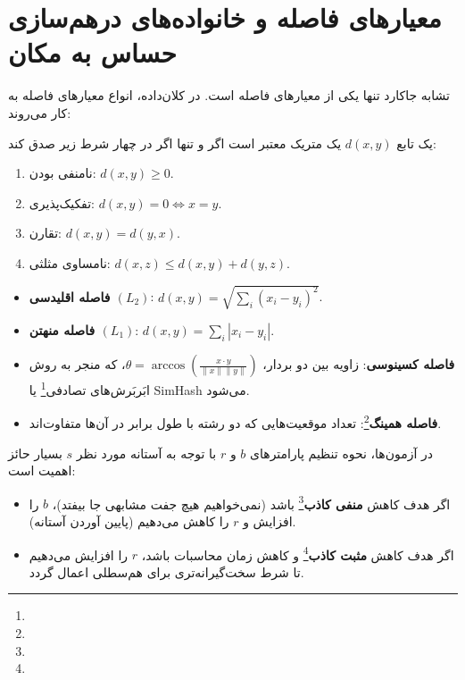 \section{معیارهای فاصله و خانواده‌های درهم‌سازی حساس به مکان}
تشابه جاکارد تنها یکی از معیارهای فاصله است. در کلان‌داده، انواع معیارهای فاصله به کار می‌روند:

\begin{definition}
یک تابع $d(x, y)$ یک متریک معتبر است اگر و تنها اگر در چهار شرط زیر صدق کند:
\begin{enumerate}
    \item نامنفی بودن: $d(x, y) \ge 0$.
    \item تفکیک‌پذیری: $d(x, y) = 0 \iff x = y$.
    \item تقارن: $d(x, y) = d(y, x)$.
    \item نامساوی مثلثی: $d(x, z) \le d(x, y) + d(y, z)$.
\end{enumerate}
\end{definition}

\begin{itemize}
    \item \textbf{فاصله اقلیدسی $(L_2)$}: $d(x, y) = \sqrt{\sum_{i} (x_i - y_i)^2}$.
    \item \textbf{فاصله منهتن $(L_1)$}: $d(x, y) = \sum_{i} |x_i - y_i|$.
    \item \textbf{فاصله کسینوسی}: زاویه بین دو بردار، $\theta = \arccos \left( \frac{x \cdot y}{\|x\| \|y\|} \right)$، که منجر به روش ابَربَرش‌های تصادفی\footnote{} یا SimHash می‌شود.
    \item \textbf{فاصله همینگ}\footnote{}: تعداد موقعیت‌هایی که دو رشته با طول برابر در آن‌ها متفاوت‌اند.
\end{itemize}

\begin{examnote}
در آزمون‌ها، نحوه تنظیم پارامترهای $b$ و $r$ با توجه به آستانه مورد نظر $s$ بسیار حائز اهمیت است:
\begin{itemize}
    \item اگر هدف کاهش \textbf{منفی کاذب}\footnote{} باشد (نمی‌خواهیم هیچ جفت مشابهی جا بیفتد)، $b$ را افزایش و $r$ را کاهش می‌دهیم (پایین آوردن آستانه).
    \item اگر هدف کاهش \textbf{مثبت کاذب}\footnote{} و کاهش زمان محاسبات باشد، $r$ را افزایش می‌دهیم تا شرط سخت‌گیرانه‌تری برای هم‌سطلی اعمال گردد.
\end{itemize}
\end{examnote}

